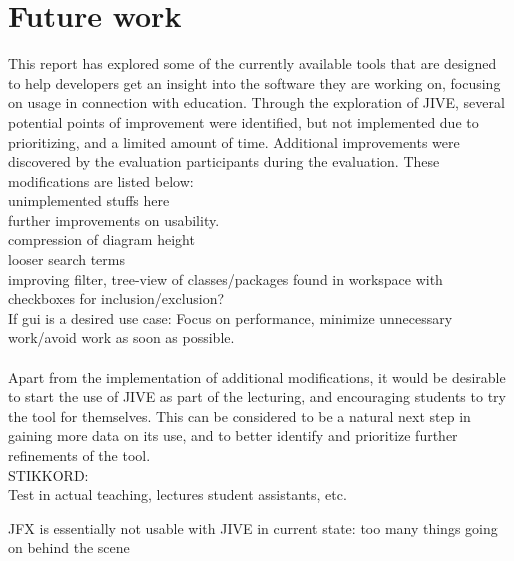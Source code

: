 \section{Future work}\label{conclusionFuture}
This report has explored some of the currently available tools that are designed to help developers get an insight into the software they are working on, focusing on usage in connection with education.
Through the exploration of JIVE, several potential points of improvement were identified, but not implemented due to prioritizing, and a limited amount of time.
Additional improvements were discovered by the evaluation participants during the evaluation.
These modifications are listed below: %
~\\

unimplemented stuffs here\\
further improvements on usability.\\
compression of diagram height\\
looser search terms\\
improving filter, tree-view of classes/packages found in workspace with checkboxes for inclusion/exclusion?\\
If gui is a desired use case: Focus on performance, minimize unnecessary work/avoid work as soon as possible.\\
~\\

Apart from the implementation of additional modifications, it would be desirable to start the use of JIVE as part of the lecturing, and encouraging students to try the tool for themselves.
This can be considered to be a natural next step in gaining more data on its use, and to better identify and prioritize further refinements of the tool.
~\\

STIKKORD:\\
Test in actual teaching, lectures student assistants, etc.

JFX is essentially not usable with JIVE in current state: too many things going on behind the scene\\


